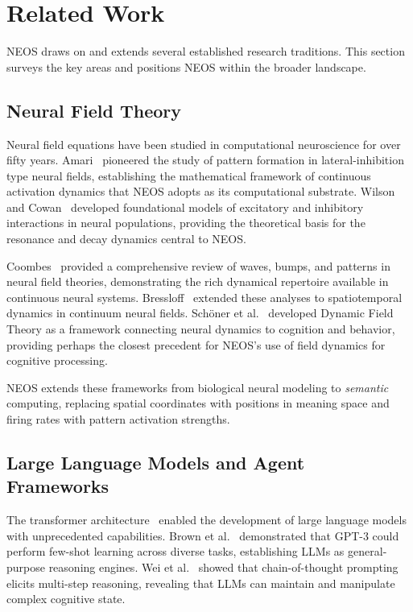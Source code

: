 \section{Related Work}\label{sec:related}

NEOS draws on and extends several established research traditions. This section surveys the key areas and positions NEOS within the broader landscape.

\subsection{Neural Field Theory}

Neural field equations have been studied in computational neuroscience for over fifty years. Amari~\cite{amari1977dynamics} pioneered the study of pattern formation in lateral-inhibition type neural fields, establishing the mathematical framework of continuous activation dynamics that NEOS adopts as its computational substrate. Wilson and Cowan~\cite{wilson1972excitatory} developed foundational models of excitatory and inhibitory interactions in neural populations, providing the theoretical basis for the resonance and decay dynamics central to NEOS.

Coombes~\cite{coombes2005waves} provided a comprehensive review of waves, bumps, and patterns in neural field theories, demonstrating the rich dynamical repertoire available in continuous neural systems. Bressloff~\cite{bressloff2012spatiotemporal} extended these analyses to spatiotemporal dynamics in continuum neural fields. Sch\"{o}ner et al.~\cite{schoner2016dynamic} developed Dynamic Field Theory as a framework connecting neural dynamics to cognition and behavior, providing perhaps the closest precedent for NEOS's use of field dynamics for cognitive processing.

NEOS extends these frameworks from biological neural modeling to \emph{semantic} computing, replacing spatial coordinates with positions in meaning space and firing rates with pattern activation strengths.

\subsection{Large Language Models and Agent Frameworks}

The transformer architecture~\cite{vaswani2017attention} enabled the development of large language models with unprecedented capabilities. Brown et al.~\cite{brown2020language} demonstrated that GPT-3 could perform few-shot learning across diverse tasks, establishing LLMs as general-purpose reasoning engines. Wei et al.~\cite{wei2022chain} showed that chain-of-thought prompting elicits multi-step reasoning, revealing that LLMs can maintain and manipulate complex cognitive state.

